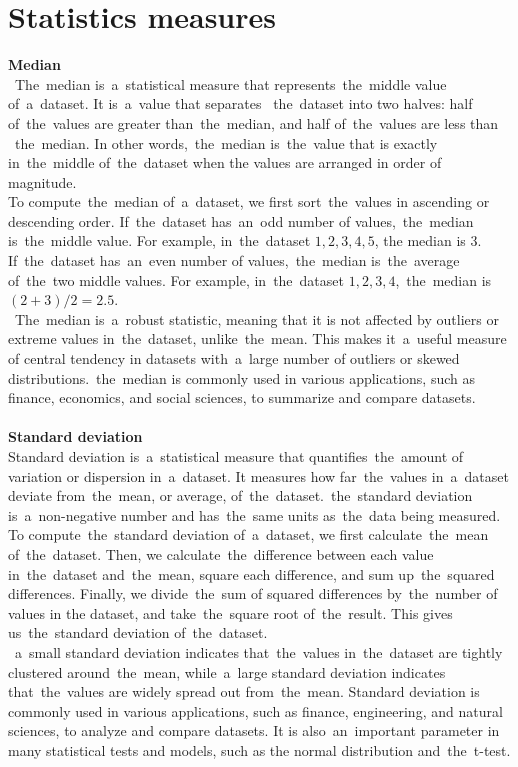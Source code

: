     \section{Statistics measures} \label{subsec:statistics}
    \textbf{Median}\\
   ~The~median is~a~statistical measure that represents~the~middle value of~a~dataset. It is~a~value that separates
   ~the~dataset into two halves: half of~the~values are greater than~the~median, and half of~the~values are less than
   ~the~median. In other words,~the~median is~the~value that is exactly in~the~middle of~the~dataset when the
    values are arranged in order of magnitude.
    \\
    To compute~the~median of~a~dataset, we first sort~the~values in ascending or descending order. If~the~dataset
    has~an~odd number of values,~the~median is~the~middle value. For example, in~the~dataset ${1, 2, 3, 4, 5}$, the
    median is $3$. If~the~dataset has~an~even number of values,~the~median is~the~average of~the~two middle values.
    For example, in~the~dataset ${1, 2, 3, 4}$,~the~median is $(2 + 3) / 2 = 2.5$.
    \\
   ~The~median is~a~robust statistic, meaning that it is not affected by outliers or extreme values in~the~dataset,
    unlike~the~mean. This makes it~a~useful measure of central tendency in datasets with~a~large number of outliers or
    skewed distributions.~the~median is commonly used in various applications, such as finance, economics, and social
    sciences, to summarize and compare datasets.\\
    \\
    \textbf{Standard deviation}\\
    Standard deviation is~a~statistical measure that quantifies~the~amount of variation or dispersion in~a~dataset.
    It measures how far~the~values in~a~dataset deviate from~the~mean, or average, of~the~dataset.~the~standard
    deviation is~a~non-negative number and has~the~same units as~the~data being measured.
    \\
    To compute~the~standard deviation of~a~dataset, we first calculate~the~mean of~the~dataset.
    Then, we calculate~the~difference between each value in~the~dataset and~the~mean, square each difference, and
    sum up~the~squared differences. Finally, we divide~the~sum of squared differences by~the~number of values in the
    dataset, and take~the~square root of~the~result. This gives us~the~standard deviation of~the~dataset.
    \\
   ~a~small standard deviation indicates that~the~values in~the~dataset are tightly clustered around~the~mean,
    while~a~large standard deviation indicates that~the~values are widely spread out from~the~mean. Standard
    deviation is commonly used in various applications, such as finance, engineering, and natural sciences, to
    analyze and compare datasets. It is also~an~important parameter in many statistical tests and models, such as the
    normal distribution and~the~t-test.

